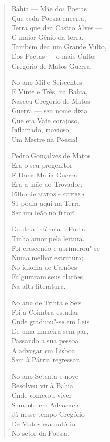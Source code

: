 \begin{verse}
Bahia --- Mãe dos Poetas \\
Que toda Poesia encerra, \\
Terra que deu Castro Alves ---\\
O maior Gênio da terra. \\
Também deu um Grande Vulto, \\
Dos Poetas --- o mais Culto: \\
Gregório de Matos Guerra. 

No ano Mil e Seiscentos \\
E Vinte e Três, na Bahia, \\
Nasceu Gregório de Matos \\
Guerra --- seu nome dizia \\
Que era Vate corajoso, \\
Inflamado, mavioso, \\
Um Mestre na Poesia! 

Pedro Gonçalves de Matos \\
Era o seu progenitor \\
E Dona Maria Guerra \\
Era a mãe do Trovador; \\
Filho de \textsc{matos} e \textsc{guerra} \\
Só podia aqui na Terra \\
Ser um leão no furor! 


Desde a infância o Poeta \\
Tinha amor pela leitura. \\
Foi crescendo e aprimorou"-se \\
Numa melhor estrutura; \\
No idioma de Camões \\
Fulguraram seus clarões \\
Na alta literatura. 

No ano de Trinta e Seis \\
Foi a Coimbra estudar \\
Onde graduou"-se em Leis \\
De uma maneira sem par, \\
Passando a sua pessoa \\
A advogar em Lisboa \\
Sem à Pátria regressar. 

No ano Setenta e nove \\
Resolveu vir à Bahia \\
Onde começou viver \\
Somente em Advocacia, \\
Já nesse tempo Gregório \\
De Matos era notório \\
No setor da Poesia. 


\end{verse}
